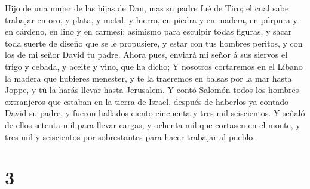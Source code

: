  Hijo de una mujer de las hijas de Dan, mas su padre fué
de Tiro; el cual sabe trabajar en oro, y plata, y metal, y hierro, en
piedra y en madera, en púrpura y en cárdeno, en lino y en carmesí;
asimismo para esculpir todas figuras, y sacar toda suerte de diseño que
se le propusiere, y estar con tus hombres peritos, y con los de mi señor
David tu padre.  Ahora pues, enviará mi señor á sus
siervos el trigo y cebada, y aceite y vino, que ha dicho;
 Y nosotros cortaremos en el Líbano la madera que
hubieres menester, y te la traeremos en balsas por la mar hasta Joppe, y
tú la harás llevar hasta Jerusalem.  Y contó Salomón
todos los hombres extranjeros que estaban en la tierra de Israel,
después de haberlos ya contado David su padre, y fueron hallados ciento
cincuenta y tres mil seiscientos.  Y señaló de ellos
setenta mil para llevar cargas, y ochenta mil que cortasen en el monte,
y tres mil y seiscientos por sobrestantes para hacer trabajar al pueblo.

\hypertarget{section-2}{%
\section{3}\label{section-2}}


